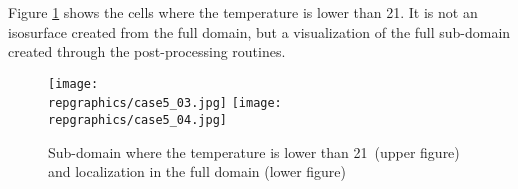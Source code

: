 Figure \ref{fige4_e5} shows the cells where the temperature
is lower than 21\degresC. It is not an isosurface created from the full domain,
but a visualization of the full sub-domain created through the post-processing
routines.

\begin{figure}[h!]
\begin{center}
\texttt{[image: \\repgraphics/case5\_03.jpg]}
\texttt{[image: \\repgraphics/case5\_04.jpg]}
\caption{Sub-domain where the temperature is lower than 21\degresC\ (upper figure)
and localization in the full domain (lower figure)}
\label{fige4_e5}
\end{center}
\end{figure}
